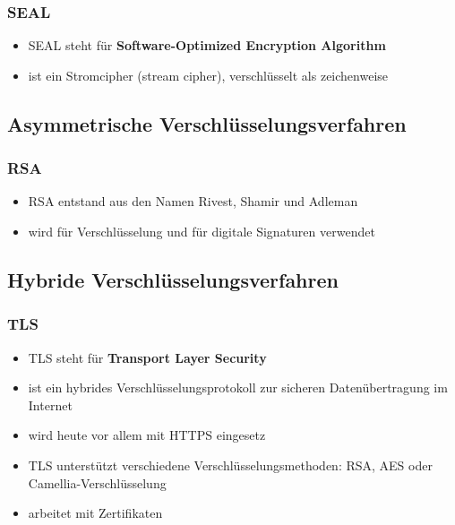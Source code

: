 \subsubsection{SEAL}

\begin{itemize}
\item SEAL steht für \textbf{Software-Optimized Encryption Algorithm}
\item ist ein Stromcipher (stream cipher), verschlüsselt als zeichenweise
\end{itemize}

\subsection{Asymmetrische Verschlüsselungsverfahren}

\subsubsection{RSA}

\begin{itemize}
\item RSA entstand aus den Namen Rivest, Shamir und Adleman
\item wird für Verschlüsselung und für digitale Signaturen verwendet
\end{itemize}

\subsection{Hybride Verschlüsselungsverfahren}

\subsubsection{TLS}

\begin{itemize}
\item TLS steht für \textbf{Transport Layer Security}
\item ist ein hybrides Verschlüsselungsprotokoll zur sicheren Datenübertragung im Internet
\item wird heute vor allem mit HTTPS eingesetz
\item TLS unterstützt verschiedene Verschlüsselungsmethoden: RSA, AES oder Camellia-Verschlüsselung
\item arbeitet mit Zertifikaten
\end{itemize}